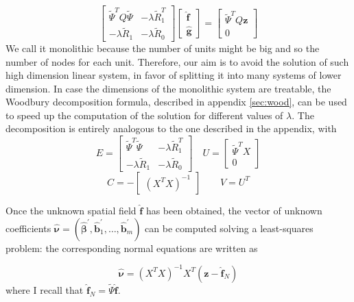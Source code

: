 \begin{equation}
	\label{mono}
	\begin{bmatrix}
		\tilde{\Psi}^TQ\tilde{\Psi} & -\lambda \tilde{R}_1^T \\
		-\lambda \tilde{R}_1        & -\lambda \tilde{R}_0
	\end{bmatrix}
	\begin{bmatrix}
		\hat{\bm{f}} \\
		\hat{\bm{g}}
	\end{bmatrix}
	=
	\begin{bmatrix}
		\tilde{\Psi}^T Q\bm{z} \\
		0
	\end{bmatrix}
\end{equation}
We call it monolithic because the number of units might be big and so
the number of nodes for each unit. Therefore, our aim is to avoid the solution
of such high dimension linear system, in favor of splitting it into many
systems of lower dimension. In case the dimensions of the monolithic system are
treatable, the Woodbury decomposition formula, described in appendix
\ref{sec:wood}, can be used to speed up the computation of the solution for
different values of $\lambda$. The decomposition is entirely analogous to the
one described in the appendix, with
\begin{equation}
	\label{eq:wootilde}
	E =
	\begin{bmatrix}
		\tilde{\Psi}^T\tilde{\Psi} & -\lambda \tilde{R}_1^T \\
		-\lambda \tilde{R}_1       & -\lambda \tilde{R}_0
	\end{bmatrix}
	\quad U =
	\begin{bmatrix}
		\tilde{\Psi}^TX \\
		0
	\end{bmatrix}
\end{equation}
\begin{equation*}
	C = -
	\begin{bmatrix}
		\left(X^TX\right)^{-1}
	\end{bmatrix}
	\quad \quad V = U^T
\end{equation*}

Once the unknown spatial field $\hat{\bm{f}}$ has been obtained, the vector of
unknown coefficients $\hat{\bm{\nu}} = (\hat{\bm{\beta}}^\prime,
	\hat{\bm{b}}_1^\prime, \dots, \hat{\bm{b}}_m^\prime)$ can be computed solving a
least-squares problem: the corresponding normal equations are written as

\begin{equation}
	\label{nu}
	\hat{\bm{\nu}} = \left(X^TX\right)^{-1}X^T\left(\bm{z} - \hat{\bm{f}}_N\right)
\end{equation}
where I recall that $\hat{\bm{f}}_N = \tilde{\Psi} \hat{\bm{f}}$.

